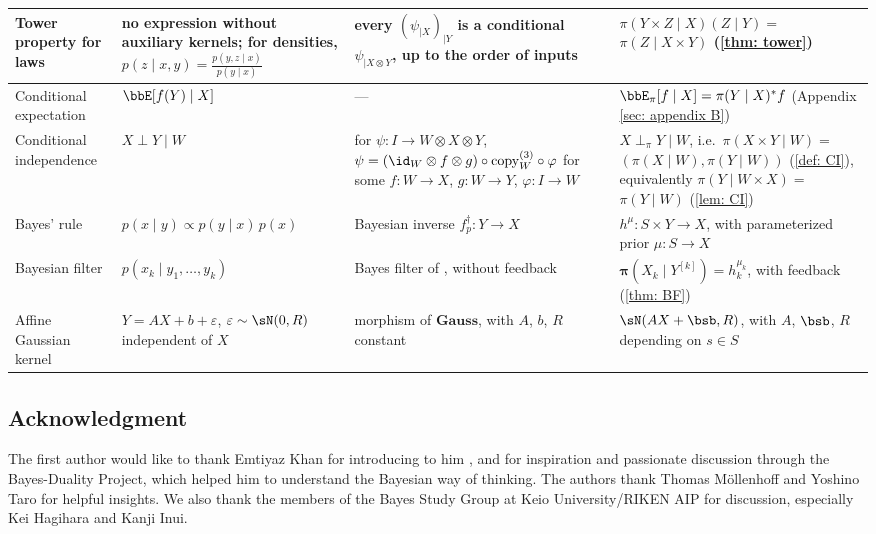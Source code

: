 \documentclass[12pt,reqno]{amsart}%
\theoremstyle{plain}
\theoremstyle{definition}
\def\bspi{\boldsymbol{\pi}}
\begin{document}
\begin{longtable}{|>{\raggedright\arraybackslash}p{}|>{\raggedright\arraybackslash}p{}|>{\raggedright\arraybackslash}p{}|>{\raggedright\arraybackslash}p{}|}
Tower property for laws
& no expression without auxiliary kernels; for densities, $p(z\mid x,y)=\frac{p(y,z\mid x)}{p(y\mid x)}$
& every $(\psi_{|X})_{|Y}$ is a conditional $\psi_{|X\otimes Y}$, up to the order of inputs \cite[Lemma~11.11]{F20}
& $\pi(Y\times Z\mid X)(Z\mid Y)=$\newline $\pi(Z\mid X\times Y)$ (\cref{thm: tower})\\
\hline
Conditional expectation
& $\bbE[f(Y)\mid X]$
& ---
& $\bbE_\pi[f\mid X]=\pi(Y\mid X)^*f$ (Appendix \ref{sec: appendix B})\\
\hline
Conditional independence
& $X\perp Y\mid W$
& for $\psi\colon I\rightarrow W\otimes X\otimes Y$, $\psi=(\id_W\otimes f\otimes g)\circ\mathrm{copy}^{(3)}_W\circ\varphi$ for some $f\colon W\rightarrow X$, $g\colon W\rightarrow Y$, $\varphi\colon I\rightarrow W$ \cite[Definition~12.1]{F20}
& $X\perp_\pi Y\mid W$, i.e.\ $\pi(X\times Y\mid W)=$\newline $(\pi(X\mid W),\pi(Y\mid W))$ (\cref{def: CI}), equivalently $\pi(Y\mid W\times X)=$\newline $\pi(Y\mid W)$ (\cref{lem: CI})\\
\hline
Bayes' rule
& $p(x\mid y)\propto p(y\mid x)\,p(x)$
& Bayesian inverse $f^\dagger_p\colon Y\rightarrow X$
& $h^\mu\colon S\times Y\rightarrow X$, with parameterized prior $\mu\colon S\rightarrow X$\\
\hline
Bayesian filter
& $p(x_k\mid y_1,\ldots,y_k)$
& Bayes filter of \cite{F25}, without feedback
& $\bspi(X_k\mid Y^{[k]})=h_k^{\mu_k}$, with feedback (\cref{thm: BF})\\
\hline
Affine Gaussian kernel
& $Y=AX+b+\varepsilon$, $\varepsilon\sim\sN(0,R)$ independent of $X$
& morphism of $\mathbf{Gauss}$, with $A$, $b$, $R$ constant
& $\sN(AX+\bsb,R)$, with $A$, $\bsb$, $R$ depending on $s\in S$\\
\hline
\end{longtable}
\endgroup


\subsection*{Acknowledgment}

The first author would like to thank Emtiyaz Khan for introducing to him \cite{J03},
and for inspiration and passionate discussion through the Bayes-Duality Project,
which helped him to understand the Bayesian way of thinking.
The authors thank Thomas M\"ollenhoff and Yoshino Taro 
for helpful insights.  We  also thank
the members of the Bayes Study Group at Keio University/RIKEN AIP
for discussion, especially Kei Hagihara and Kanji Inui.

\begin{bibdiv}
	\begin{biblist}
	\end{biblist}
\end{bibdiv}
\end{document}
